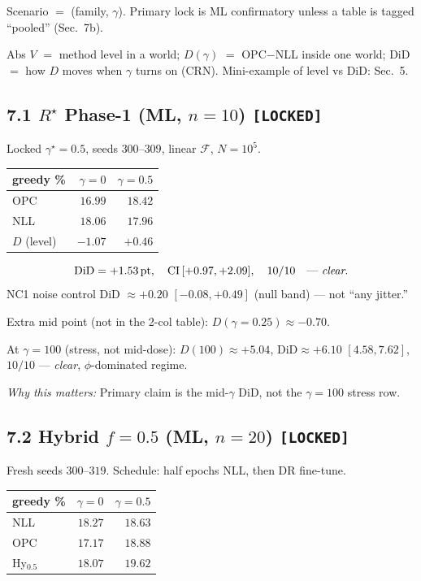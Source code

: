 \documentclass[11pt]{article}
\newcommand{\phonesub}[1]{\Needspace{6\baselineskip}\subsection*{#1}}
\newcommand{\stag}[1]{\texttt{[#1]}}
\newcommand{\Rstar}{R^{\star}}
\newcommand{\why}[1]{\par{\footnotesize\color{blue!35!black}\textit{Why this matters:} #1\par}}
\begin{document}
Scenario $=$ (family, $\gamma$). Primary lock
is ML confirmatory unless a table is tagged
``pooled'' (Sec.~7b).

Abs $V$ $=$ method level in a world;
$D(\gamma)$ $=$ OPC$-$NLL inside one world;
DiD $=$ how $D$ moves when $\gamma$ turns on
(CRN). Mini-example of level vs DiD: Sec.~5.

\phonesub{7.1 $\Rstar$ Phase-1 (ML, $n{=}10$)
\stag{LOCKED}}

Locked $\gamma^{\star}{=}0.5$, seeds
$300$--$309$, linear $\mathcal{F}$,
$N{=}10^{5}$.

{\scriptsize
\begin{tabular}{@{}l rr@{}}
\toprule
greedy \% & $\gamma{=}0$ & $\gamma{=}0.5$ \\
\midrule
OPC & $16.99$ & $18.42$ \\
NLL & $18.06$ & $17.96$ \\
$D$ (level) & $-1.07$ & $+0.46$ \\
\bottomrule
\end{tabular}}

\[
\mathrm{DiD}=+1.53\,\mathrm{pt},\quad
\mathrm{CI}\,[+0.97,+2.09],\quad 10/10
\quad\text{--- \emph{clear}.}
\]
NC1 noise control DiD $\approx +0.20$
$[-0.08,+0.49]$ (null band) --- not
``any jitter.''

Extra mid point (not in the 2-col table):
$D(\gamma{=}0.25)\approx -0.70$.

At $\gamma{=}100$ (stress, not mid-dose):
$D(100)\approx +5.04$,
$\mathrm{DiD}\approx +6.10$
$[4.58,7.62]$, $10/10$ --- \emph{clear},
$\phi$-dominated regime.

\why{Primary claim is the mid-$\gamma$ DiD,
not the $\gamma{=}100$ stress row.}

\phonesub{7.2 Hybrid $f{=}0.5$ (ML, $n{=}20$)
\stag{LOCKED}}

Fresh seeds $300$--$319$. Schedule:
half epochs NLL, then DR fine-tune.

{\scriptsize
\begin{tabular}{@{}l rr@{}}
\toprule
greedy \% & $\gamma{=}0$ & $\gamma{=}0.5$ \\
\midrule
NLL & $18.27$ & $18.63$ \\
OPC & $17.17$ & $18.88$ \\
Hy$_{0.5}$ & $18.07$ & $\mathbf{19.62}$ \\
\bottomrule
\end{tabular}}
\end{document}
